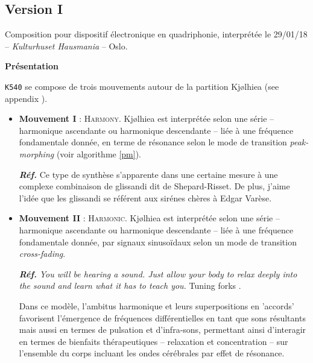 \subsection[\texttt{v.I}]{Version I}

\smallskip

Composition pour dispositif \'electronique en quadriphonie, 
interpr\'et\'ee le 29/01/18 -- \textit{Kulturhuset Hausmania} -- Oslo.

\bigskip

\noindent \textbf{{\large Pr\'esentation}}
\hrulefill

\bigskip

\texttt{K540} se compose de trois mouvements autour de la partition Kj{\o}lhiea (see appendix ).

\begin{itemize}[leftmargin=0.4in]
\item \textbf{Mouvement I} : \textsc{Harmony}. Kj{\o}lhiea est interpr\'et\'ee selon une s\'erie -- harmonique ascendante ou harmonique descendante 
 -- li\'ee \`a une fr\'equence fondamentale donn\'ee, en terme de r\'esonance selon le mode de transition \textsl{peak-morphing} (voir algorithme \ref{pm}).

\textbf{\textit{R\'ef.}} Ce type de synth\`ese s'apparente dans une certaine mesure \`a une complexe combinaison de glissandi dit de Shepard-Risset. De plus, j'aime l'id\'ee que les glissandi se r\'ef\'erent aux sir\'enes ch\`eres \`a Edgar Var\`ese.
 \end{itemize}

\begin{itemize}[leftmargin=0.4in]
\item \textbf{Mouvement II} : \textsc{Harmonic}. Kj{\o}lhiea est interpr\'et\'ee selon une s\'erie -- harmonique ascendante ou harmonique descendante 
 -- li\'ee \`a une fr\'equence fondamentale donn\'ee, par signaux sinuso\"idaux selon un mode de transition \textsl{cross-fading}.

\textbf{\textit{R\'ef.}} \textit{You will be hearing a sound. Just allow your body to relax deeply into the sound and learn what it has to teach you.} Tuning forks \citep[pp. 89--99]{hm}.

Dans ce  mod\`ele, 
l'ambitus harmonique et leurs superpositions en 'accords' favorisent l'\'emergence de fr\'equences diff\'erentielles en tant que sons r\'esultants mais aussi en termes de pulsation et d'infra-sons,  permettant ainsi d'interagir en termes de bienfaits th\'erapeutiques -- relaxation et concentration -- sur l'ensemble du corps incluant les ondes c\'er\'ebrales \citep{ocm} par effet de r\'esonance.
 \end{itemize}

